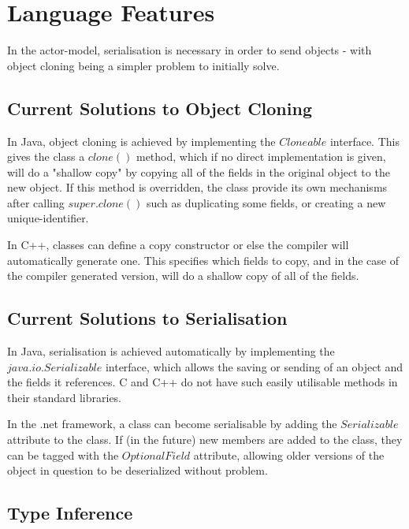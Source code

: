 \documentclass[11pt,a4paper]{report}
\begin{document}
\newpage
\section{Language Features}

In the actor-model, serialisation is necessary in order to send objects - with object cloning being a simpler problem to initially solve.
 
\subsection{Current Solutions to Object Cloning}

In Java, object cloning is achieved by implementing the $Cloneable$ interface\cite{java-cloneable}. This gives the class a $clone()$ method, which if no direct implementation is given, will do a "shallow copy" by copying all of the fields in the original object to the new object.
If this method is overridden, the class provide its own mechanisms after calling $super.clone()$ such as duplicating some fields, or creating a new unique-identifier.

In C++, classes can define a copy constructor or else the compiler will automatically generate one\cite{ansi:03:c++}. This specifies which fields to copy, and in the case of the compiler generated version, will do a shallow copy of all of the fields.

\subsection{Current Solutions to Serialisation}

In Java, serialisation is achieved automatically by implementing the $java.io.Serializable$ \cite{java-serializable} interface, which allows the saving or sending of an object and the fields it references.
C and C++ do not have such easily utilisable methods in their standard libraries.

In the .net framework, a class can become serialisable by adding the $Serializable$\cite{net-serializable} attribute to the class.
If (in the future) new members are added to the class, they can be tagged with the $OptionalField$ attribute\cite{net-optional}, allowing older versions of the object in question to be deserialized without problem.

\subsection{Type Inference}
\end{document}
